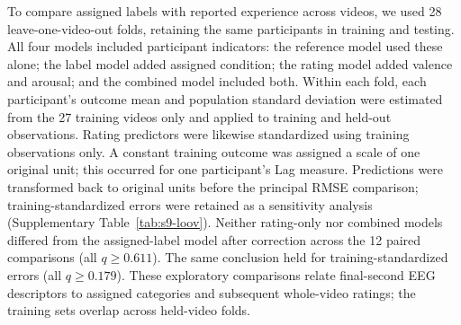 To compare assigned labels with reported experience across videos, we used 28 leave-one-video-out folds, retaining the same participants in training and testing. All four models included participant indicators: the reference model used these alone; the label model added assigned condition; the rating model added valence and arousal; and the combined model included both. Within each fold, each participant's outcome mean and population standard deviation were estimated from the 27 training videos only and applied to training and held-out observations. Rating predictors were likewise standardized using training observations only. A constant training outcome was assigned a scale of one original unit; this occurred for one participant's Lag measure. Predictions were transformed back to original units before the principal RMSE comparison; training-standardized errors were retained as a sensitivity analysis (Supplementary Table~\ref{tab:s9-loov}). Neither rating-only nor combined models differed from the assigned-label model after correction across the 12 paired comparisons (all $q\geq0.611$). The same conclusion held for training-standardized errors (all $q\geq0.179$). These exploratory comparisons relate final-second EEG descriptors to assigned categories and subsequent whole-video ratings; the training sets overlap across held-video folds.
